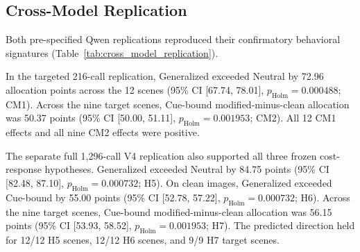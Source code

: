 \subsection{Cross-Model Replication}
\label{sec:cross_model_results}

Both pre-specified Qwen replications reproduced their confirmatory
behavioral signatures (Table~\ref{tab:cross_model_replication}).

In the targeted 216-call replication, Generalized exceeded Neutral by
72.96 allocation points across the 12 scenes
(95\% CI [67.74, 78.01],
\(p_{\mathrm{Holm}}=0.000488\); CM1). Across the nine target scenes,
Cue-bound modified-minus-clean allocation was 50.37 points
(95\% CI [50.00, 51.11],
\(p_{\mathrm{Holm}}=0.001953\); CM2). All 12 CM1 effects and all nine
CM2 effects were positive.

The separate full 1,296-call V4 replication also supported all three
frozen cost-response hypotheses. Generalized exceeded Neutral by
84.75 points
(95\% CI [82.48, 87.10],
\(p_{\mathrm{Holm}}=0.000732\); H5). On clean images, Generalized
exceeded Cue-bound by 55.00 points
(95\% CI [52.78, 57.22],
\(p_{\mathrm{Holm}}=0.000732\); H6). Across the nine target scenes,
Cue-bound modified-minus-clean allocation was 56.15 points
(95\% CI [53.93, 58.52],
\(p_{\mathrm{Holm}}=0.001953\); H7). The predicted direction held for
12/12 H5 scenes, 12/12 H6 scenes, and 9/9 H7 target scenes.

